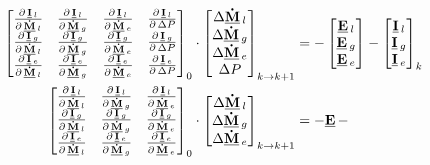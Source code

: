 \begin{align}
\begin{bmatrix} 
\DerivParOne{\vec{I}_{l}}{\vec{\dot{M}}_{l}} & \DerivParOne{\vec{I}_{l}}{\vec{\dot{M}}_{g}}  & \DerivParOne{\vec{I}_{l}}{\vec{\dot{M}}_{e}} & \DerivParOne{\vec{I}_{l}}{\Delta P}\\
\DerivParOne{\vec{I}_{g}}{\vec{\dot{M}}_{l}} & \DerivParOne{\vec{I}_{g}}{\vec{\dot{M}}_{g}}  & \DerivParOne{\vec{I}_{g}}{\vec{\dot{M}}_{e}} & \DerivParOne{\vec{I}_{g}}{\Delta P}\\
\DerivParOne{\vec{I}_{e}}{\vec{\dot{M}}_{l}} & \DerivParOne{\vec{I}_{e}}{\vec{\dot{M}}_{g}}  & \DerivParOne{\vec{I}_{e}}{\vec{\dot{M}}_{e}} & \DerivParOne{\vec{I}_{e}}{\Delta P}
\end{bmatrix}_{0}
\cdot
\begin{bmatrix}
\Delta \vec{\dot{M}}_l \\
\Delta \vec{\dot{M}}_g \\
\Delta \vec{\dot{M}}_e \\
\Delta P
\end{bmatrix}_{k\rightarrow k+1} & =
-\begin{bmatrix}
\vec{E}_{l} \\
\vec{E}_{g} \\
\vec{E}_{e}
\end{bmatrix} -
\begin{bmatrix}
\vec{I}_{l} \\
\vec{I}_{g} \\
\vec{I}_{e}
\end{bmatrix}_{k} \\ 
\begin{bmatrix} 
\DerivParOne{\vec{I}_{l}}{\vec{\dot{M}}_{l}} & \DerivParOne{\vec{I}_{l}}{\vec{\dot{M}}_{g}}  & \DerivParOne{\vec{I}_{l}}{\vec{\dot{M}}_{e}} \\
\DerivParOne{\vec{I}_{g}}{\vec{\dot{M}}_{l}} & \DerivParOne{\vec{I}_{g}}{\vec{\dot{M}}_{g}}  & \DerivParOne{\vec{I}_{g}}{\vec{\dot{M}}_{e}} \\
\DerivParOne{\vec{I}_{e}}{\vec{\dot{M}}_{l}} & \DerivParOne{\vec{I}_{e}}{\vec{\dot{M}}_{g}}  & \DerivParOne{\vec{I}_{e}}{\vec{\dot{M}}_{e}}
\end{bmatrix}_{0}
\cdot
\begin{bmatrix}
\Delta \vec{\dot{M}}_l \\
\Delta \vec{\dot{M}}_g \\
\Delta \vec{\dot{M}}_e
\end{bmatrix}_{k\rightarrow k+1} & =
-\vec{E} -

\end{align}
